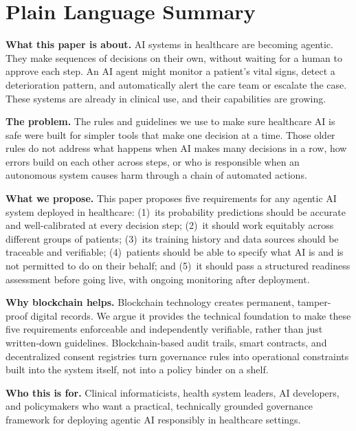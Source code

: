 \documentclass[12pt,a4paper]{article}
\begin{document}
\section*{Plain Language Summary}

\textbf{What this paper is about.}
AI systems in healthcare are becoming agentic. They make
sequences of decisions on their own, without waiting for a human
to approve each step. An AI agent might monitor a patient's vital
signs, detect a deterioration pattern, and automatically alert
the care team or escalate the case. These systems are already in
clinical use, and their capabilities are growing.

\textbf{The problem.}
The rules and guidelines we use to make sure healthcare AI is
safe were built for simpler tools that make one decision at a
time. Those older rules do not address what happens when AI makes
many decisions in a row, how errors build on each other across
steps, or who is responsible when an autonomous system causes
harm through a chain of automated actions.

\textbf{What we propose.}
This paper proposes five requirements for any agentic AI system
deployed in healthcare: (1)~its probability predictions should be
accurate and well-calibrated at every decision step; (2)~it
should work equitably across different groups of patients;
(3)~its training history and data sources should be traceable and
verifiable; (4)~patients should be able to specify what AI is and
is not permitted to do on their behalf; and (5)~it should pass a
structured readiness assessment before going live, with ongoing
monitoring after deployment.

\textbf{Why blockchain helps.}
Blockchain technology creates permanent, tamper-proof digital
records. We argue it provides the technical foundation to make
these five requirements enforceable and independently verifiable,
rather than just written-down guidelines. Blockchain-based audit
trails, smart contracts, and decentralized consent registries
turn governance rules into operational constraints built into the
system itself, not into a policy binder on a shelf.

\textbf{Who this is for.}
Clinical informaticists, health system leaders, AI developers,
and policymakers who want a practical, technically grounded
governance framework for deploying agentic AI responsibly in
healthcare settings.
\end{document}

